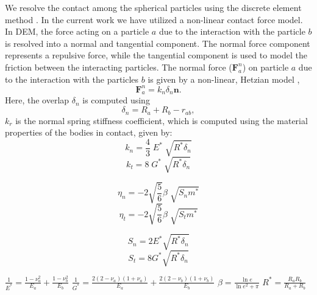 \documentclass[preprint,12pt]{elsarticle}
\newcommand{\teng}[1]{\ensuremath{\boldsymbol{#1}}}
\newcommand{\ten}[1]{\ensuremath{\mathbf{#1}}}
\begin{document}
We resolve the contact among the spherical particles using the discrete
element method \cite{luding_dem_2008}. In the current work we have utilized a
non-linear contact force model. In DEM, the force acting on a particle $a$ due
to the interaction with the particle $b$ is resolved into a normal and
tangential component. The normal force component represents a repulsive force,
while the tangential component is used to model the friction between the
interacting particles.  The normal force ($\teng{F}_a^{n}$) on particle $a$
due to the interaction with the particles $b$ is given by a non-linear,
Hetzian model \cite{brilliantov1996model},
\begin{equation}
  \label{eq:contact-algorithm-normal}
  \ten{F}_a^n = k_n \delta_{n} \ten{n}.
\end{equation}
Here, the overlap $\delta_{n}$ is computed using
\begin{equation}
  \label{eq:cf-overlap}
  \delta_{n} = R_{a} + R_{b} - r_{ab},
\end{equation}
$k_r$ is the normal spring stiffness coefficient, which is computed using the
material properties of the bodies in contact, given by:
\begin{equation}
  \label{eq:kf-stiffness}
  k_n = \frac{4}{3} \; E^{*} \; \sqrt{R^{*} \delta_n}
\end{equation}
\begin{equation}
  \label{eq:kf-stiffness}
  k_t = 8 \; G^{*} \; \sqrt{R^{*} \delta_n}
\end{equation}

\begin{equation}
  \label{eq:kf-stiffness}
  \eta_n = -2 \sqrt{\frac{5}{6}} \beta \; \sqrt{S_n m^*}
\end{equation}
\begin{equation}
  \label{eq:kf-stiffness}
  \eta_t = -2 \sqrt{\frac{5}{6}} \beta \; \sqrt{S_t m^*}
\end{equation}

\begin{equation}
  \label{eq:kf-stiffness}
  S_n = 2 E^{*} \sqrt{R^{*} \delta_n}
\end{equation}
\begin{equation}
  \label{eq:kf-stiffness}
  S_t = 8 G^{*} \sqrt{R^{*} \delta_n}
\end{equation}




$\frac{1}{E^{*}} = \frac{1 -\nu_a^2}{E_a} + \frac{1 -\nu_b^2}{E_b}$
$\frac{1}{G^{*}} = \frac{2 (2 - \nu_a) (1 + \nu_a)}{E_a} +  \frac{2 (2 - \nu_b) (1 + \nu_b)}{E_b}$
$\beta = \frac{\ln{e}}{\ln{e}^2 + \pi}$
$R^{*} = \frac{R_a R_b}{R_a + R_b}$
\end{document}
